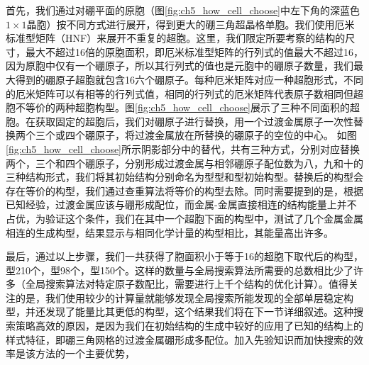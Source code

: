 首先，我们通过对硼平面的原胞（图\ref{fig:ch5_how_cell_choose}中左下角的深蓝色$1\times 1$晶胞）按不同方式进行展开，得到更大的硼三角超晶格单胞。我们使用厄米标准型矩阵（HNF）\cite{hart2008algorithm}来展开不重复的超胞。这里，我们限定所要考察的结构的尺寸，最大不超过\num{16}倍的原胞面积，即厄米标准型矩阵的行列式的值最大不超过\num{16}，因为原胞中仅有一个硼原子，所以其行列式的值也是元胞中的硼原子数量，我们最大得到的硼原子超胞就包含\num{16}六个硼原子。每种厄米矩阵对应一种超胞形式，不同的厄米矩阵可以有相等的行列式值，相同的行列式的厄米矩阵代表原子数相同但超胞不等价的两种超胞构型。图\ref{fig:ch5_how_cell_choose}展示了三种不同面积的超胞。在获取固定的超胞后，我们对硼原子进行替换，用一个过渡金属原子一次性替换两个三个或四个硼原子，将过渡金属放在所替换的硼原子的空位的中心。
如图\ref{fig:ch5_how_cell_choose}所示阴影部分中的替代，共有三种方式，分别对应替换两个，三个和四个硼原子，分别形成过渡金属与相邻硼原子配位数为八，九和十的三种结构形式，我们将其初始结构分别命名为型型和型初始构型。替换后的构型会存在等价的构型，我们通过查重算法将等价的构型去除。同时需要提到的是，根据已知经验，过渡金属应该与硼形成配位，而金属-金属直接相连的结构能量上并不占优，为验证这个条件，我们在其中一个超胞下面的构型中，测试了几个金属金属相连的生成构型，结果显示与相同化学计量的构型相比，其能量高出许多。

最后，通过以上步骤，我们一共获得了胞面积小于等于16的超胞下取代后的构型，型\num{210}个，型\num{98}个，型\num{150}个。这样的数量与全局搜索算法所需要的总数相比少了许多（全局搜索算法对特定原子数配比，需要进行上千个结构的优化计算）。值得关注的是，我们使用较少的计算量就能够发现全局搜索所能发现的全部单层稳定构型，并还发现了能量比其更低的构型，这个结果我们将在下一节详细叙述。这种搜索策略高效的原因，是因为我们在初始结构的生成中较好的应用了已知的结构上的样式特征，即硼三角网格的过渡金属硼形成多配位。加入先验知识而加快搜索的效率是该方法的一个主要优势，

